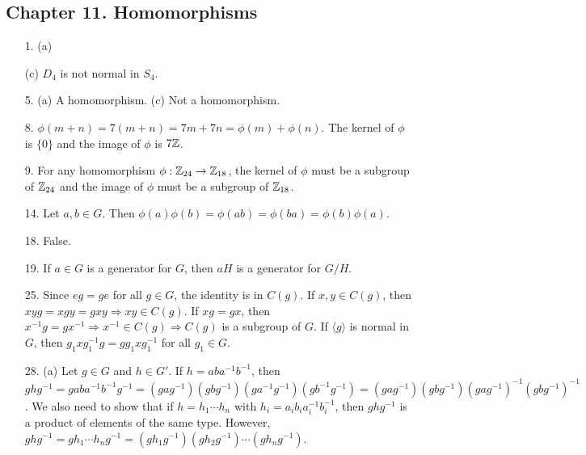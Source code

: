 \subsection*{Chapter 11. Homomorphisms}
 
{\small
\begin{itemize}
 
\item[1.]
(a)

(c) $D_4$ is not normal in $S_4$.
 
 
\item[5.]
(a) A homomorphism.
(c) Not a homomorphism.
 
 
\item[8.]
$\phi(m + n) = 7(m+n) = 7m + 7n = \phi(m) + \phi(n)$. The kernel of
$\phi$ is $\{ 0 \}$ and the image of $\phi$ is $7{\Bbb Z}$.
 
 
\item[9.]
For any homomorphism $\phi : {\Bbb Z}_{24} \rightarrow {\Bbb
Z}_{18}$, the kernel of $\phi$ must be a subgroup of ${\Bbb Z}_{24}$
and the image of $\phi$ must be a subgroup of ${\Bbb Z}_{18}$.
 
 
\item[14.]
Let $a, b \in G$. Then $\phi(a) \phi(b) = \phi(ab) = \phi(ba) =
\phi(b)\phi(a)$. 
 
\item[18.]
False.
 
\item[19.]
If $a \in G$ is a generator for $G$, then $aH$ is a generator for $G/H$.
 
\item[25.]
Since $eg = ge$ for all $g \in G$, the identity is in $C(g)$. If $x,
y \in C(g)$, then $xy g = x g y = g xy \Rightarrow xy \in C(g)$.  If
$x g = g x$, then $x^{-1} g = g x^{-1} \Rightarrow x^{-1} \in C(g)
\Rightarrow C(g)$ is a subgroup of $G$. If $\langle g \rangle$ is
normal in $G$, then $g_1 x g_1^{-1} g = g g_1 x g_1^{-1}$ for all $g_1
\in G$.
 
\item[28.]
(a)
Let $g \in G$ and $h \in G'$. If $h = aba^{-1}b^{-1}$, then $ghg^{-1}
= gaba^{-1}b^{-1}g^{-1} 
= (gag^{-1})(gbg^{-1})(ga^{-1}g^{-1})(gb^{-1}g^{-1}) 
= (gag^{-1})(gbg^{-1})(gag^{-1})^{-1}(gbg^{-1})^{-1}$. We also need to
show that if $h = h_1 \cdots h_n$ with $h_i = a_i b_i a_i^{-1}
b_i^{-1}$, then $ghg^{-1}$ is a product of elements of the same type.
However, $ghg^{-1} = g h_1 \cdots h_n g^{-1} =
(gh_1g^{-1})(gh_2g^{-1}) \cdots (gh_ng^{-1})$.
 
 
 
 
\end{itemize}
}

